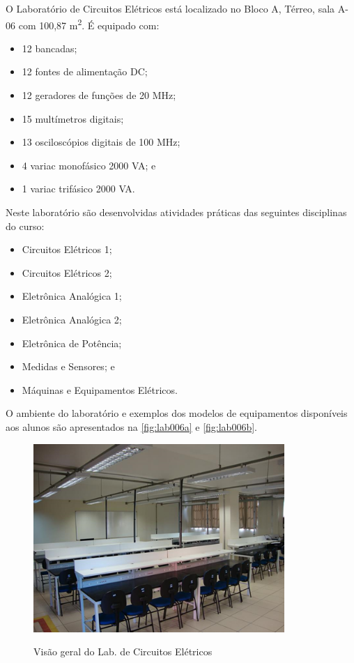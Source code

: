O Laboratório de Circuitos Elétricos está localizado no Bloco A, Térreo, sala A-06 com 100,87 m\textsuperscript{2}. É equipado com:

\begin{itemize}
    \item 12 bancadas; 
    \item 12 fontes de alimentação DC; 
    \item 12 geradores de funções de 20 MHz; 
    \item 15 multímetros digitais; 
    \item 13 osciloscópios digitais de 100 MHz;
    \item 4 variac monofásico 2000 VA; e
    \item 1 variac trifásico 2000 VA.    
\end{itemize}

Neste laboratório são desenvolvidas atividades práticas das seguintes disciplinas do curso:

\begin{itemize}
    \item Circuitos Elétricos 1;
    \item Circuitos Elétricos 2;
    \item Eletrônica Analógica 1;
    \item Eletrônica Analógica 2;
    \item Eletrônica de Potência;
    \item Medidas e Sensores; e
    \item Máquinas e Equipamentos Elétricos.    
\end{itemize}

O ambiente do laboratório e exemplos dos modelos de equipamentos disponíveis aos alunos são apresentados na \autoref{fig:lab006a} e \autoref{fig:lab006b}.

\begin{figure}[!htb]
    \centering
    \caption{Visão geral do Lab. de Circuitos Elétricos}
    \includegraphics[width=0.85\textwidth]{Caps/Figs/lab006a.png}
    \fonte{\utf}
    \label{fig:lab006a}
\end{figure}

